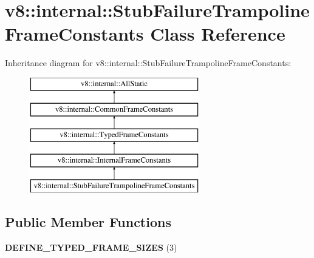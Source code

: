\hypertarget{classv8_1_1internal_1_1_stub_failure_trampoline_frame_constants}{}\section{v8\+:\+:internal\+:\+:Stub\+Failure\+Trampoline\+Frame\+Constants Class Reference}
\label{classv8_1_1internal_1_1_stub_failure_trampoline_frame_constants}
Inheritance diagram for v8\+:\+:internal\+:\+:Stub\+Failure\+Trampoline\+Frame\+Constants\+:\begin{figure}[H]
\begin{center}
\leavevmode
\includegraphics[height=5.000000cm]{classv8_1_1internal_1_1_stub_failure_trampoline_frame_constants}
\end{center}
\end{figure}
\subsection*{Public Member Functions}
\begin{DoxyCompactItemize}
\item 
{\bfseries D\+E\+F\+I\+N\+E\+\_\+\+T\+Y\+P\+E\+D\+\_\+\+F\+R\+A\+M\+E\+\_\+\+S\+I\+Z\+ES} (3)\hypertarget{classv8_1_1internal_1_1_stub_failure_trampoline_frame_constants_adefaa064ceafd17b009cd00b6ec54864}{}\label{classv8_1_1internal_1_1_stub_failure_trampoline_frame_constants_adefaa064ceafd17b009cd00b6ec54864}

\end{DoxyCompactItemize}
